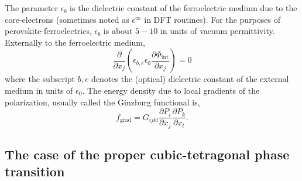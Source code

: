 \documentclass[22pt]{article} %
\begin{document}
%
The parameter $\epsilon_b$ is the dielectric constant of the ferroelectric medium due to the core-electrons (sometimes noted as $\epsilon^\infty$ in DFT routines).
%
For the purposes of perovskite-ferroelectrics, $\epsilon_b$ is about $5-10$ in units of vacuum permittivity. 
%
Externally to the ferroelectric medium, 
%
$$\frac{\partial}{\partial x_j} \left( \epsilon_{b,e} \epsilon_0 \frac{\partial \Phi_\mathrm{int}}{\partial x_j}\right) = 0$$
%
where the subscript $b,e$ denotes the (optical) dielectric constant of the external medium in units of $\epsilon_0$.
%
The energy density due to local gradients of the polarization, usually called the Ginzburg functional is, 
%
$$f_\mathrm{grad} = G_{ijkl} \frac{\partial P_i}{\partial x_j} \frac{\partial P_k}{\partial x_l}.$$
%

%
\subsection{The case of the proper cubic-tetragonal phase transition}
%

%
\end{document}
